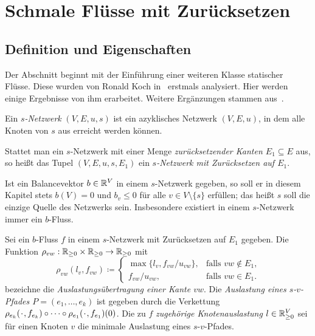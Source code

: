 \chapter{Schmale Flüsse mit Zurücksetzen}\label{chapter-thin-flows}
\newcommand*{\PlH}{\makebox[1ex]{\textbf{$\cdot$}}}

\section{Definition und Eigenschaften}

Der Abschnitt beginnt mit der Einführung einer weiteren Klasse statischer Flüsse.
Diese wurden von Ronald Koch in~\cite{Koch2012} erstmals analysiert.
Hier werden einige Ergebnisse von ihm erarbeitet.
Weitere Ergänzungen stammen aus~\cite{Cominetti2015}.

\begin{definition}[$s$-Netzwerk]
	Ein \emph{$s$-Netzwerk} $(V, E, u, s)$ ist ein azyklisches Netzwerk $(V, E, u)$, in dem alle Knoten von $s$ aus erreicht werden können.

	 Stattet man ein $s$-Netzwerk mit einer Menge \emph{zurücksetzender Kanten $E_1\subseteq E$} aus, so heißt das Tupel $(V, E, u, s, E_1)$ ein \emph{$s$-Netzwerk mit Zurücksetzen auf $E_1$}.
\end{definition}

Ist ein Balancevektor $b\in\mathbb{R}^V$ in einem $s$-Netzwerk gegeben, so soll er in diesem Kapitel stets $b(V) = 0$ und $b_v\leq 0$ für alle $v\in V\setminus \{ s \}$ erfüllen; das heißt $s$ soll die einzige Quelle des Netzwerks sein.
Insbesondere existiert in einem $s$-Netzwerk immer ein $b$-Fluss.



\begin{definition}
	Sei ein $b$-Fluss $f$ in einem $s$-Netzwerk mit Zurück\-setzen auf $E_1$ gegeben.
	Die Funktion $\rho_{vw}: \mathbb{R}_{\geq 0}\times \mathbb{R}_{\geq 0} \to \mathbb{R}_{\geq 0}$  mit \[ \rho_{vw}(l_v, f_{vw}) \coloneq \begin{cases}
		\max\{ l_v, f_{vw} / u_{vw} \}, & \text{falls $vw\notin E_1$,}\\
		f_{vw} / u_{vw}, & \text{falls $vw\in E_1$.}
	\end{cases}
	\]
	bezeichne die \emph{Auslastungsübertragung einer Kante $vw$}.
	Die \emph{Auslastung eines $s$-$v$-Pfades $P=(e_1,\dots,e_k)$} ist gegeben durch die Verkettung $\rho_{e_k}(\PlH, f_{e_k})\circ \dots \circ \rho_{e_1}(\PlH, f_{e_1})(0)$.
	Die zu $f$ \emph{zugehörige Knotenauslastung $l\in\mathbb{R}_{\geq 0}^V$} sei für einen Knoten $v$ die minimale Auslastung eines $s$-$v$-Pfades.
\end{definition}


